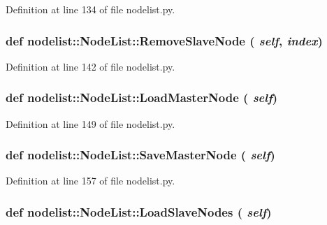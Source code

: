 Definition at line 134 of file nodelist.py.\hypertarget{classnodelist_1_1NodeList_4a54d5c47f48af8060e1b7e0a8a52f6d}{
\subsubsection[RemoveSlaveNode]{\setlength{\rightskip}{0pt plus 5cm}def nodelist::Node\-List::Remove\-Slave\-Node ( {\em self},  {\em index})}}
\label{classnodelist_1_1NodeList_4a54d5c47f48af8060e1b7e0a8a52f6d}




Definition at line 142 of file nodelist.py.\hypertarget{classnodelist_1_1NodeList_ff252235b084983f34a6f1455e1ee2a2}{
\subsubsection[LoadMasterNode]{\setlength{\rightskip}{0pt plus 5cm}def nodelist::Node\-List::Load\-Master\-Node ( {\em self})}}
\label{classnodelist_1_1NodeList_ff252235b084983f34a6f1455e1ee2a2}




Definition at line 149 of file nodelist.py.\hypertarget{classnodelist_1_1NodeList_d297a4f5ea828c7a56592ffa23ed9913}{
\subsubsection[SaveMasterNode]{\setlength{\rightskip}{0pt plus 5cm}def nodelist::Node\-List::Save\-Master\-Node ( {\em self})}}
\label{classnodelist_1_1NodeList_d297a4f5ea828c7a56592ffa23ed9913}




Definition at line 157 of file nodelist.py.\hypertarget{classnodelist_1_1NodeList_d0b1264363626cc954199e3fa572620a}{
\subsubsection[LoadSlaveNodes]{\setlength{\rightskip}{0pt plus 5cm}def nodelist::Node\-List::Load\-Slave\-Nodes ( {\em self})}}
\label{classnodelist_1_1NodeList_d0b1264363626cc954199e3fa572620a}




